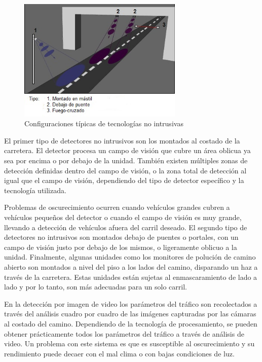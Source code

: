 \begin{figure}[h]
	\centering
	\includegraphics[width=0.7\textwidth]{capitulos/3/figuras/figura3.jpg}
	\caption{\label{fig:noIntrusica}  Configuraciones típicas de tecnologías no intrusivas}	
\end{figure}

El primer tipo de detectores no intrusivos son los montados al costado de la carretera. El detector procesa un campo de visión que cubre un área oblicua ya sea por encima o por debajo de la unidad. También existen múltiples zonas de detección definidas dentro del campo de visión,  o la zona total de detección al igual que el campo de visión, dependiendo del tipo de detector específico y la tecnología utilizada.

Problemas de oscurecimiento ocurren cuando vehículos grandes cubren a vehículos pequeños del detector o cuando el campo de visión es muy grande, llevando a detección de vehículos afuera del carril deseado. El segundo tipo de detectores no intrusivos son montados debajo de puentes o portales, con un campo de visión justo por debajo de los mismos, o ligeramente oblicuo a la unidad. Finalmente, algunas unidades como los monitores de polución de camino abierto son montados a nivel del piso a los lados del camino, disparando un haz a través de la carretera. Estas unidades están sujetas al enmascaramiento de lado a lado y por lo tanto, son más adecuadas para un solo carril.

En la detección por imagen de video los parámetros del tráfico son recolectados a través del análisis cuadro por cuadro de las imágenes capturadas por las cámaras al costado del camino. Dependiendo de la tecnología de procesamiento, se pueden obtener prácticamente todos los parámetros del tráfico a través de análisis de video. Un problema con este sistema es que es susceptible al oscurecimiento y su rendimiento puede decaer con el mal clima o con bajas condiciones de luz.

